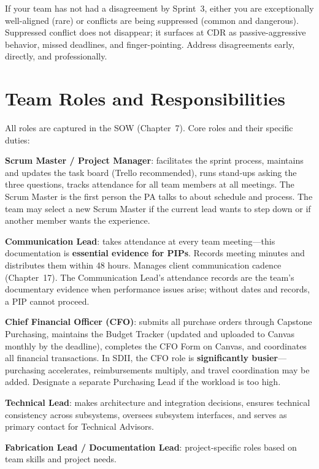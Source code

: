 \begin{tipbox}
If your team has not had a disagreement by Sprint~3, either you are exceptionally well-aligned (rare) or conflicts are being suppressed (common and dangerous). Suppressed conflict does not disappear; it surfaces at CDR as passive-aggressive behavior, missed deadlines, and finger-pointing. Address disagreements early, directly, and professionally.
\end{tipbox}

\section{Team Roles and Responsibilities}
All roles are captured in the SOW (Chapter~7). Core roles and their specific duties:

\textbf{Scrum Master / Project Manager}: facilitates the sprint process, maintains and updates the task board (Trello recommended), runs stand-ups asking the three questions, tracks attendance for all team members at all meetings. The Scrum Master is the first person the PA talks to about schedule and process. The team may select a new Scrum Master if the current lead wants to step down or if another member wants the experience.

\textbf{Communication Lead}: takes attendance at every team meeting---this documentation is \textbf{essential evidence for PIPs}. Records meeting minutes and distributes them within 48 hours. Manages client communication cadence (Chapter~17). The Communication Lead's attendance records are the team's documentary evidence when performance issues arise; without dates and records, a PIP cannot proceed.

\textbf{Chief Financial Officer (CFO)}: submits all purchase orders through Capstone Purchasing, maintains the Budget Tracker (updated and uploaded to Canvas monthly by the deadline), completes the CFO Form on Canvas, and coordinates all financial transactions. In SDII, the CFO role is \textbf{significantly busier}---purchasing accelerates, reimbursements multiply, and travel coordination may be added. Designate a separate Purchasing Lead if the workload is too high.

\textbf{Technical Lead}: makes architecture and integration decisions, ensures technical consistency across subsystems, oversees subsystem interfaces, and serves as primary contact for Technical Advisors.

\textbf{Fabrication Lead / Documentation Lead}: project-specific roles based on team skills and project needs.


